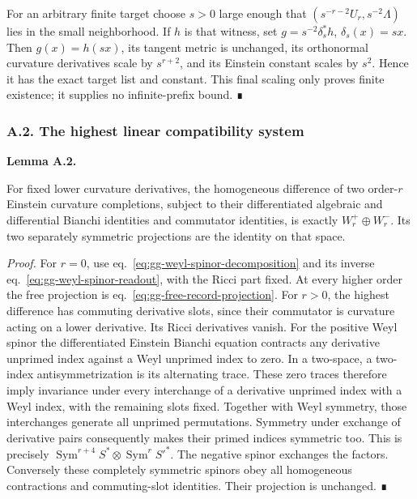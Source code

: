\documentclass[
  english,
  11pt,
  reqno]{amsart}
\makeatletter
\newcommand{\pandocstatementheading}[1]{%
  \par\addpenalty{\@beginparpenalty}%
  \addvspace{.5\baselineskip plus .2\baselineskip minus .2\baselineskip}%
  {\normalfont\bfseries #1\par}%
  \nobreak\@afterindenttrue\@afterheading
}
\makeatother
\begin{document}
For an arbitrary finite target choose \(s>0\) large enough that
\((s^{-r-2}U_r,\allowbreak s^{-2}\Lambda)\) lies in the small neighborhood. If \(h\)
is that witness, set \(g=s^{-2}\delta_s^*h\), \(\delta_s(x)=sx\). Then
\(g(x)=h(sx)\), its tangent metric is unchanged, its orthonormal
curvature derivatives scale by \(s^{r+2}\), and its Einstein constant
scales by \(s^2\). Hence it has the exact target list and constant. This
final scaling only proves finite existence; it supplies no
infinite-prefix bound. ∎

\protect{}\label{sec:gg-polynomial-completion}

\subsubsection{A.2. The highest linear compatibility
system}\label{a.2.-the-highest-linear-compatibility-system}

\pandocstatementheading{\protect{}\label{lem:gg-highest-kernel}Lemma A.2.}

For fixed lower curvature derivatives, the homogeneous difference of two
order-\(r\) Einstein curvature completions, subject to their
differentiated algebraic and differential Bianchi identities and
commutator identities, is exactly \(W_r^+\oplus W_r^-\). Its two
separately symmetric projections are the identity on that space.

\emph{Proof.} For \(r=0\), use eq.~\ref{eq:gg-weyl-spinor-decomposition}
and its inverse eq.~\ref{eq:gg-weyl-spinor-readout}, with the Ricci part
fixed. At every higher order the free projection is
eq.~\ref{eq:gg-free-record-projection}. For \(r>0\), the highest
difference has commuting derivative slots, since their commutator is
curvature acting on a lower derivative. Its Ricci derivatives vanish.
For the positive Weyl spinor the differentiated Einstein Bianchi
equation contracts any derivative unprimed index against a Weyl unprimed
index to zero. In a two-space, a two-index antisymmetrization is its
alternating trace. These zero traces therefore imply invariance under
every interchange of a derivative unprimed index with a Weyl index, with
the remaining slots fixed. Together with Weyl symmetry, those
interchanges generate all unprimed permutations. Symmetry under exchange
of derivative pairs consequently makes their primed indices symmetric
too. This is precisely
\(\operatorname{Sym}^{r+4}S^*\otimes\operatorname{Sym}^rS'^*\). The
negative spinor exchanges the factors. Conversely these completely
symmetric spinors obey all homogeneous contractions and commuting-slot
identities. Their projection is unchanged. ∎
\end{document}
